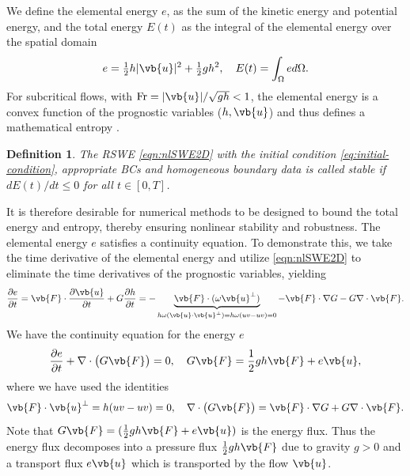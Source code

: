 \documentclass{article}
\numberwithin{equation}{section}
\newtheorem{definition}{Definition}
\theoremstyle{definition}
\begin{document}
We define the elemental energy $e$, as the sum of the kinetic energy and potential energy, and the total energy $E(t)$ as the integral of the elemental energy over the spatial domain
\begin{equation}\label{eq:elemental}
   e=\tfrac{1}{2}h|\vb{u}|^2 + \tfrac{1}{2}gh^2, \quad E(t) = \int_{\Omega} e d\Omega.
\end{equation}
For subcritical flows, with $\mathrm{Fr} = |\vb{u}|/\sqrt{gh} < 1$, the elemental energy is a convex function of the prognostic variables ($h,\vb{u}$) and thus defines a mathematical entropy \cite{ricardo2023conservation,HEW2025113624}. 
\begin{definition}\label{def:stability}
    The RSWE \eqref{eqn:nlSWE2D} with the initial condition \eqref{eq:initial-condition}, appropriate BCs and homogeneous boundary data is called stable  if $dE(t)/dt \le 0$ for all $t \in [0, T]$.
\end{definition}
It is therefore desirable for numerical methods to be designed to bound the total energy and entropy, thereby ensuring nonlinear stability and robustness. The elemental energy $e$ satisfies a continuity equation. To demonstrate this, we take the time derivative of the elemental energy and utilize \eqref{eqn:nlSWE2D} to eliminate the time derivatives of the prognostic variables, yielding
%
\begin{equation}
     \frac{\partial e}{\partial t } = \vb{F}\cdot \frac{\partial \vb{u}}{\partial t } + G\frac{\partial h}{\partial t }   = -\underbrace{\vb{F}\cdot (\omega \vb{u}^\perp)}_{h\omega (\vb{u}\cdot\vb{u}^\perp)=  h\omega(u v - uv) =0} - \vb{F}\cdot \nabla G - G\nabla \cdot \vb{F}.
 \end{equation}
 We have the continuity equation for the energy $e$
\begin{equation}\label{eq:energy_continuity}
    \frac{\partial e}{\partial t } + \nabla \cdot \big(G\vb{F}\big) = 0, \quad G\vb{F} = \frac{1}{2}gh\vb{F} + e \vb{u},
\end{equation}
where we have used the identities 
$$
\vb{F}\cdot  \vb{u}^\perp =  h (u v - uv) = 0, \quad \nabla \cdot \big(G\vb{F}\big) = \vb{F}\cdot \nabla G + G\nabla \cdot \vb{F}.
$$
Note that  $G\vb{F} = (\frac{1}{2}gh\vb{F} + e \vb{u})$ is the energy flux. Thus the energy flux decomposes into a pressure flux $\frac{1}{2}gh\vb{F}$ due to gravity $g>0$ and a transport flux $e \vb{u}$ which is transported by the flow $\vb{u}$.
\end{document}
